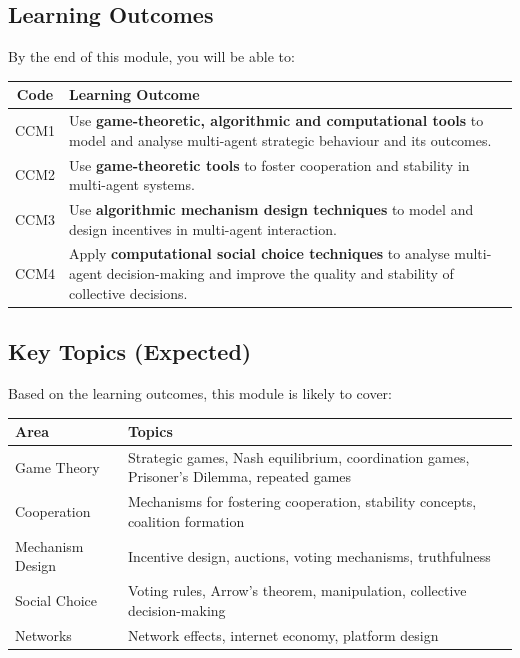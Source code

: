 \bigseparator

\subsection*{Learning Outcomes}

By the end of this module, you will be able to:

\begin{center}
\renewcommand{\arraystretch}{1.4}
\begin{tabular}{@{} c p{12cm} @{}}
\toprule
\textbf{Code} & \textbf{Learning Outcome} \\
\midrule
CCM1 & Use \textbf{game-theoretic, algorithmic and computational tools} to model and analyse multi-agent strategic behaviour and its outcomes. \\
CCM2 & Use \textbf{game-theoretic tools} to foster cooperation and stability in multi-agent systems. \\
CCM3 & Use \textbf{algorithmic mechanism design techniques} to model and design incentives in multi-agent interaction. \\
CCM4 & Apply \textbf{computational social choice techniques} to analyse multi-agent decision-making and improve the quality and stability of collective decisions. \\
\bottomrule
\end{tabular}
\end{center}

\bigseparator

\subsection*{Key Topics (Expected)}

Based on the learning outcomes, this module is likely to cover:

\begin{center}
\renewcommand{\arraystretch}{1.3}
\begin{tabular}{@{} l p{10cm} @{}}
\toprule
\textbf{Area} & \textbf{Topics} \\
\midrule
Game Theory & Strategic games, Nash equilibrium, coordination games, Prisoner's Dilemma, repeated games \\
Cooperation & Mechanisms for fostering cooperation, stability concepts, coalition formation \\
Mechanism Design & Incentive design, auctions, voting mechanisms, truthfulness \\
Social Choice & Voting rules, Arrow's theorem, manipulation, collective decision-making \\
Networks & Network effects, internet economy, platform design \\
\bottomrule
\end{tabular}
\end{center}

